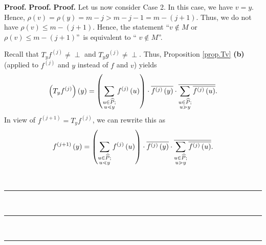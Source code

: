 \documentclass[numbers=enddot,12pt,final,onecolumn,notitlepage]{scrartcl}%
\theoremstyle{definition}
\newenvironment{verlong}{}{}
\newcommand{\undf}{\operatorname*{\bot}}
\newenvironment{proof}[1][Proof]{\noindent\textbf{#1.} }{\ \rule{0.5em}{0.5em}}
\let\sumnonlimits\sum
\renewcommand{\sum}{\sumnonlimits\limits}
\begin{document}
\begin{verlong}
\begin{proof}
\begin{proof}
\begin{proof}
Let us now consider Case 2. In this case, we have $v=y$. Hence, $\rho\left(
v\right)  =\rho\left(  y\right)  =m-j>m-j-1=m-\left(  j+1\right)  $. Thus, we
do not have $\rho\left(  v\right)  \leq m-\left(  j+1\right)  $. Hence, the
statement \textquotedblleft$v\notin M$ or $\rho\left(  v\right)  \leq
m-\left(  j+1\right)  $\textquotedblright\ is equivalent to \textquotedblleft%
$v\notin M$\textquotedblright.

Recall that $T_{y}f^{\left(  j\right)  }\neq\undf$ and $T_{y}g^{\left(
j\right)  }\neq\undf$. Thus, Proposition \ref{prop.Tv} \textbf{(b)} (applied
to $f^{\left(  j\right)  }$ and $y$ instead of $f$ and $v$) yields%
\[
\left(  T_{y}f^{\left(  j\right)  }\right)  \left(  y\right)  =\left(
\sum\limits_{\substack{u\in\widehat{P};\\u\lessdot y}}f^{\left(  j\right)
}\left(  u\right)  \right)  \cdot\overline{f^{\left(  j\right)  }\left(
y\right)  }\cdot\overline{\sum\limits_{\substack{u\in\widehat{P};\\u\gtrdot
y}}\overline{f^{\left(  j\right)  }\left(  u\right)  }}.
\]
In view of $f^{\left(  j+1\right)  }=T_{y}f^{\left(  j\right)  }$, we can
rewrite this as%
\begin{equation}
f^{\left(  j+1\right)  }\left(  y\right)  =\left(  \sum\limits_{\substack{u\in
\widehat{P};\\u\lessdot y}}f^{\left(  j\right)  }\left(  u\right)  \right)
\cdot\overline{f^{\left(  j\right)  }\left(  y\right)  }\cdot\overline
{\sum\limits_{\substack{u\in\widehat{P};\\u\gtrdot y}}\overline{f^{\left(
j\right)  }\left(  u\right)  }}. \label{pf.lem.ato1.c1.IG.pf.3f}%
\end{equation}



\end{proof}
\end{proof}
\end{proof}
\end{verlong}
\end{document}
